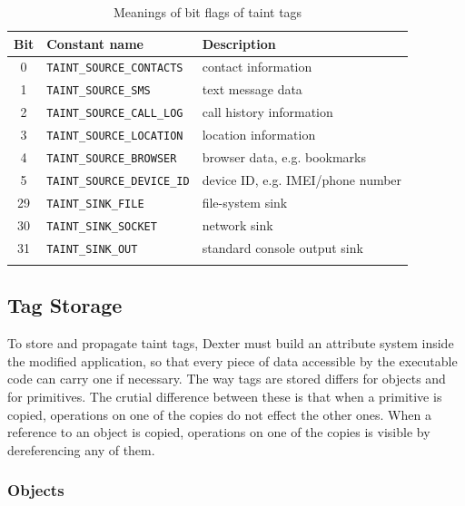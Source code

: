\documentclass[12pt,twoside,notitlepage]{report}
\begin{document}
\begin{table}
	\begin{center}
	\begin{tabular}{|c|l|l|}
		\firsthline
		\textbf{Bit} & \textbf{Constant name}        & \textbf{Description} \\
		\hline
		0            & \verb$TAINT_SOURCE_CONTACTS$  & contact information \\
		1            & \verb$TAINT_SOURCE_SMS$       & text message data \\
		2            & \verb$TAINT_SOURCE_CALL_LOG$  & call history information \\
		3            & \verb$TAINT_SOURCE_LOCATION$  & location information \\
		4            & \verb$TAINT_SOURCE_BROWSER$   & browser data, e.g. bookmarks \\
		5            & \verb$TAINT_SOURCE_DEVICE_ID$ & device ID, e.g. IMEI/phone number \\
		\hline
		29           & \verb$TAINT_SINK_FILE$        & file-system sink \\
		30           & \verb$TAINT_SINK_SOCKET$      & network sink \\
		31           & \verb$TAINT_SINK_OUT$         & standard console output sink \\
		\lasthline
	\end{tabular}
	\end{center}
	\caption{Meanings of bit flags of taint tags}
	\label{table:TaintTagStorage_BitMeaning}
\end{table}

\subsection{Tag Storage}

To store and propagate taint tags, Dexter must build an attribute system inside the modified application, so that every piece of data accessible by the executable code can carry one if necessary. The way tags are stored differs for objects and for primitives. The crutial difference between these is that when a primitive is copied, operations on one of the copies do not effect the other ones. When a reference to an object is copied, operations on one of the copies is visible by dereferencing any of them.

\subsubsection{Objects}
\end{document}
